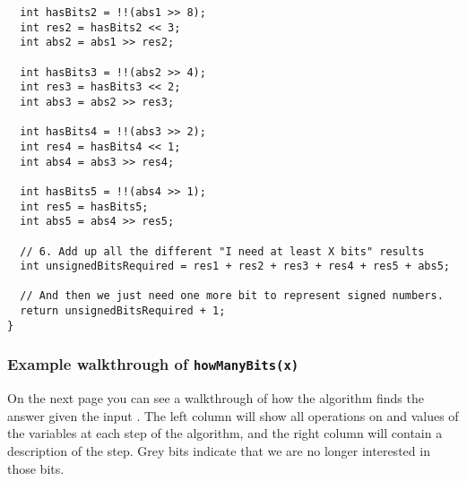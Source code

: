 \begin{verbatim}
  int hasBits2 = !!(abs1 >> 8);
  int res2 = hasBits2 << 3;
  int abs2 = abs1 >> res2;

  int hasBits3 = !!(abs2 >> 4);
  int res3 = hasBits3 << 2;
  int abs3 = abs2 >> res3;

  int hasBits4 = !!(abs3 >> 2);
  int res4 = hasBits4 << 1;
  int abs4 = abs3 >> res4;

  int hasBits5 = !!(abs4 >> 1);
  int res5 = hasBits5;
  int abs5 = abs4 >> res5;

  // 6. Add up all the different "I need at least X bits" results
  int unsignedBitsRequired = res1 + res2 + res3 + res4 + res5 + abs5;

  // And then we just need one more bit to represent signed numbers.
  return unsignedBitsRequired + 1;
}
\end{verbatim}
\egroup

\subsubsection{Example walkthrough of \texttt{howManyBits(x)}}

On the next page you can see a walkthrough of how the algorithm finds the answer given the input . The left column will show all operations on and values of the variables at each step of the algorithm, and the right column will contain a description of the step. Grey bits indicate that we are no longer interested in those bits.

\newpage

\newpage
